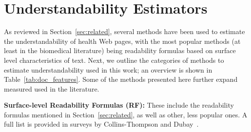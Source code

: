 
\section{ Understandability Estimators}
\label{sec:proxies}

As reviewed in Section~\ref{sec:related}, several methods have been used to estimate the understandability of health Web pages, with the most popular methods (at least in the biomedical literature) being readability formulas based on surface level characteristics of text. Next, we outline the categories of methods to estimate understandability used in this work; an overview is shown in Table~\ref{tab:doc_features}. Some of the methods presented here further expand measured used in the literature. 
 


\textbf{Surface-level Readability Formulas (RF):}
These include the readability formulas mentioned in Section~\ref{sec:related}, as well as other, less popular ones. A full list is provided in surveys by Collins-Thompson \cite{collins2014computational} and Dubay~\cite{dubay04}.



